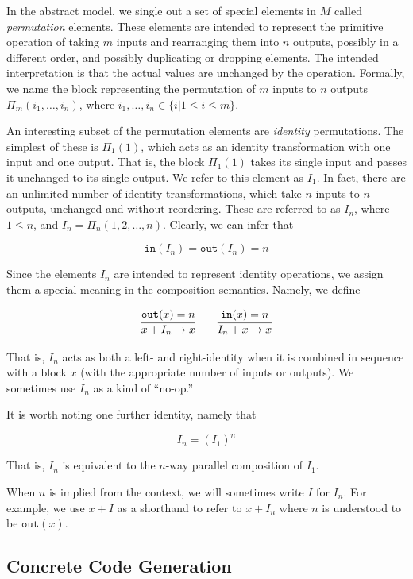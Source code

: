 In the abstract model, we single out a set of special elements in $M$ called \emph{permutation} elements. These elements are intended to represent the primitive operation of taking $m$ inputs and rearranging them into $n$ outputs, possibly in a different order, and possibly duplicating or dropping elements. The intended interpretation is that the actual values are unchanged by the operation. Formally, we name the block representing the permutation of $m$ inputs to $n$ outputs $\Pi_m(i_1,\ldots,i_n)$, where $i_1,\ldots,i_n \in \lbrace i | 1 \leq i \leq m \rbrace$.

An interesting subset of the permutation elements are \emph{identity} permutations. The simplest of these is $\Pi_1(1)$, which acts as an identity transformation with one input and one output. That is, the block $\Pi_1(1)$ takes its single input and passes it unchanged to its single output. We refer to this element as $I_1$. In fact, there are an unlimited number of identity transformations, which take $n$ inputs to $n$ outputs, unchanged and without reordering. These are referred to as $I_n$, where $1 \leq n$, and $I_n = \Pi_n(1,2,\ldots,n)$. Clearly, we can infer that

\[
\mathtt{in}(I_n) = \mathtt{out}(I_n) = n
\]

Since the elements $I_n$ are intended to represent identity operations, we assign them a special meaning in the composition semantics. Namely, we define

\[
\infer
  {x + I_n \to x}
  {\mathtt{out}(x) = n}
\qquad
\infer
  {I_n + x \to x}
  {\mathtt{in}(x) = n}
\]

That is, $I_n$ acts as both a left- and right-identity when it is combined in sequence with a block $x$ (with the appropriate number of inputs or outputs). We sometimes use $I_n$ as a kind of ``no-op.''

It is worth noting one further identity, namely that

\[
I_n = (I_1)^n
\]

That is, $I_n$ is equivalent to the $n$-way parallel composition of $I_1$.

When $n$ is implied from the context, we will sometimes write $I$ for $I_n$. For example, we use $x+I$ as a shorthand to refer to $x+I_n$ where $n$ is understood to be $\mathtt{out}(x)$.

\subsection{Concrete Code Generation}

